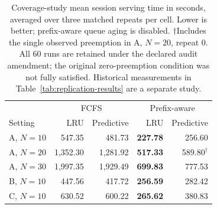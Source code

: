 \begin{table}[t]
  \centering
  \small
  \begin{tabular}{lrrrr}
    \toprule
    & \multicolumn{2}{c}{FCFS} & \multicolumn{2}{c}{Prefix-aware} \\
    Setting & LRU & Predictive & LRU & Predictive \\
    \midrule
    A, $N=10$ & 547.35 & 481.73 & \textbf{227.78} & 256.60 \\
    A, $N=20$ & 1,352.30 & 1,281.92 & \textbf{517.33} & 589.80$^{\dagger}$ \\
    A, $N=30$ & 1,997.35 & 1,929.49 & \textbf{699.83} & 777.53 \\
    B, $N=10$ & 447.56 & 417.72 & \textbf{256.59} & 282.42 \\
    C, $N=10$ & 630.52 & 600.22 & \textbf{265.62} & 380.83 \\
    \bottomrule
  \end{tabular}
  \caption{Coverage-study mean session serving time in seconds, averaged over three matched repeats per cell. Lower is better; prefix-aware queue aging is disabled. $\dagger$Includes the single observed preemption in A, $N=20$, repeat 0. All 60 runs are retained under the declared audit amendment; the original zero-preemption condition was not fully satisfied. Historical measurements in Table~\ref{tab:replication-results} are a separate study.}
  \label{tab:replication-coverage-results}
\end{table}

